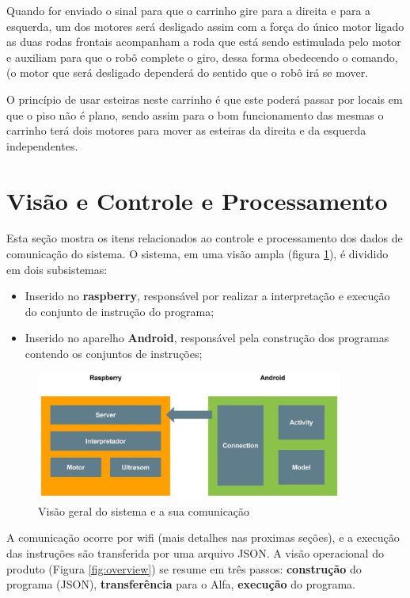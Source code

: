 Quando for enviado o sinal para que o carrinho gire para a direita e para a esquerda, um dos motores será desligado assim com a força do único motor ligado as duas rodas frontais acompanham a roda que está sendo estimulada pelo motor e auxiliam para que o robô complete o giro, dessa forma obedecendo o comando, (o motor que será desligado dependerá do sentido que o robô irá se mover.
 
O princípio de usar esteiras neste carrinho é que este poderá passar por locais em que o piso não é plano, sendo assim para o bom funcionamento das mesmas o carrinho terá dois motores  para mover as esteiras da direita e da esquerda independentes. 

\section{Visão e Controle e Processamento}

Esta seção mostra os itens relacionados ao controle e processamento dos dados de comunicação do sistema. O sistema, em uma visão ampla
(figura \ref{fig:overview_down}), é dividido em dois subsistemas:

\begin{itemize}
\item Inserido no \textbf{raspberry}, responsável por realizar a interpretação e execução do conjunto de instrução do programa;
\item Inserido no aparelho \textbf{Android}, responsável pela construção dos programas contendo os conjuntos de instruções;
\end{itemize}

\begin{figure}[H]
    \centering
    \includegraphics[width=0.9\textwidth]{figuras/overview_down.eps}
    \caption{Visão geral do sistema e a sua comunicação}
    \label{fig:overview_down}
\end{figure}

A comunicação ocorre por wifi (mais detalhes nas proximas seções), e a execução das instruções são transferida por uma arquivo JSON.
A visão operacional do produto (Figura \ref{fig:overview}) se resume em três passos: \textbf{construção} do programa (JSON), \textbf{transferência}
para o Alfa, \textbf{execução} do programa.


